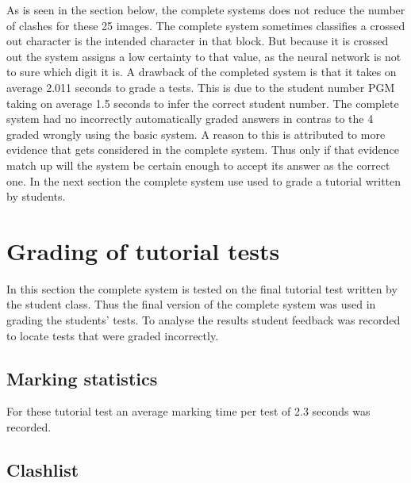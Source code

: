 As is seen in the section below, the complete systems does not reduce the number of clashes for these 25 images. The complete system sometimes classifies a crossed out character is the intended character in that block. But because it is crossed out the system assigns a low certainty to that value, as the neural network is not to sure which digit it is. A drawback of the completed system is that it takes on average 2.011 seconds to grade a tests. This is due to the student number PGM taking on average 1.5 seconds to infer the correct student number. The complete system had no incorrectly automatically graded answers in contras to the 4 graded wrongly using the basic system. A reason to this is attributed to more evidence that gets considered in the complete system. Thus only if that evidence match up will the system be certain enough to accept its answer as the correct one. In the next section the complete system use used to grade a tutorial written by students. 

\section{Grading of tutorial tests}

In this section the complete system is tested on the final tutorial test written by the student class. Thus the final version of the complete system was used in grading the students' tests. To analyse the results student feedback was recorded to locate tests that were graded incorrectly. 

\subsection{Marking statistics}

For these tutorial test  an average marking time per test of 2.3 seconds was recorded.

\subsection{Clashlist}

